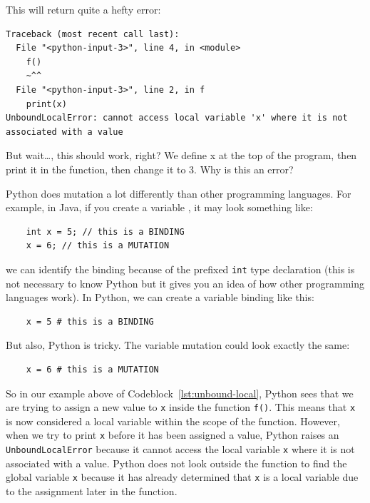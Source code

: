 This will return quite a hefty error:
\begin{verbatim}
Traceback (most recent call last):
  File "<python-input-3>", line 4, in <module>
    f()
    ~^^
  File "<python-input-3>", line 2, in f
    print(x)
UnboundLocalError: cannot access local variable 'x' where it is not associated with a value
\end{verbatim}
But wait\dots, this should work, right? We define x at the top of the program, then print it in the function, then change it to 3. Why is this an error? 

Python does mutation a lot differently than other programming languages. For example, in Java, if you create a variable , it may look something like:
\begin{verbatim}
    int x = 5; // this is a BINDING
    x = 6; // this is a MUTATION
\end{verbatim}

we can identify the binding because of the prefixed \texttt{int} type declaration (this is not necessary to know Python but it gives you an idea of how other programming languages work). In Python, we can create a variable binding like this:

\begin{verbatim}
    x = 5 # this is a BINDING
\end{verbatim}

But also, Python is tricky. The variable mutation could look exactly the same:

\begin{verbatim}
    x = 6 # this is a MUTATION
\end{verbatim}

So in our example above of Codeblock~\ref{lst:unbound-local}, Python sees that we are trying to assign a new value to \texttt{x} inside the function \texttt{f()}. This means that \texttt{x} is now considered a local variable within the scope of the function. However, when we try to print \texttt{x} before it has been assigned a value, Python raises an \texttt{UnboundLocalError} because it cannot access the local variable \texttt{x} where it is not associated with a value. Python does not look outside the function to find the global variable \texttt{x} because it has already determined that \texttt{x} is a local variable due to the assignment later in the function.